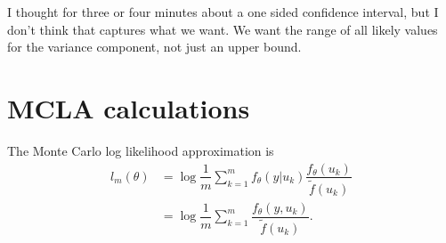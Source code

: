 \documentclass{article}
\begin{document}
I thought for three or four minutes about a one sided confidence interval, but I don't think that captures what we want. We want the range of all likely values for the variance component, not just an upper bound.

%
%
%
%
%




\appendix
\section{MCLA calculations}
The Monte Carlo log likelihood approximation is
\begin{align}
l_{m}(\theta) &=\log \dfrac{1}{m} \sum_{k=1}^mf_\theta(y|u_k)  \dfrac{ f_\theta(u_k)   }{\tilde{f}(u_k)}\\
&= \log \dfrac{1}{m} \sum_{k=1}^m  \dfrac{ f_\theta(y,u_k)   }{\tilde{f}(u_k)}.
\end{align}
\end{document}

